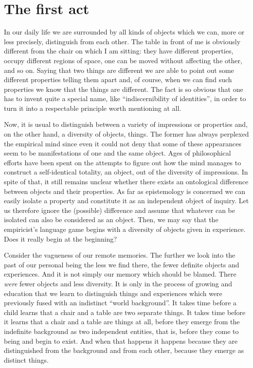 \section{The first act}\label{se:act}
In our daily life we are surrounded by all kinds of objects which we can, more or less precisely, distinguish from each other. The table in front of me is obviously different from the chair on which I am sitting: they have different properties, occupy different regions of space, one can be moved without affecting the other, and so on. Saying that two things are different we are able to point out some different properties telling them apart and, of course, when we can find such properties we know that the things are different. The fact is so obvious that one has to invent quite a special name, like ``indiscernibility of identities'', in order to turn it into a respectable principle worth mentioning at all.

Now, it is usual to distinguish between a variety of impressions or properties and, on the other hand, a diversity of objects, things. The former has always perplexed the empirical mind since even it could not deny that some of these appearances seem to be manifestations of one and the same object. Ages of philosophical efforts have been spent on the attempts to figure out how the mind manages to construct a self-identical totality, an object, out of the diversity of impressions. In spite of that, it still remains unclear whether there exists an ontological difference between objects and their properties. As far as epistemology is concerned we can easily isolate a property and constitute it as an independent object of inquiry. Let us therefore ignore the (possible) difference and assume that whatever can be isolated can also be considered as an object. Then, we may say that the empiricist's language game begins with a diversity of objects given in experience. Does it really begin at the beginning?

Consider the vagueness  of our remote memories. The further we look into the past of our personal being the less we find there, the fewer definite objects and experiences. And it is not simply our memory which should be blamed. There {\em were} fewer objects and less diversity. It is only in the process of growing and education that we learn to distinguish things and experiences which were previously fused with an indistinct ``world background''. It takes time before a child learns that a chair and a table are two separate things. It takes time before it learns that a chair and a table are things at all, before they emerge from the indefinite background as two independent entities, that is, before they come to being and begin to exist. And when that happens it happens because they are distinguished from the background and from each other, because they emerge as distinct things.


